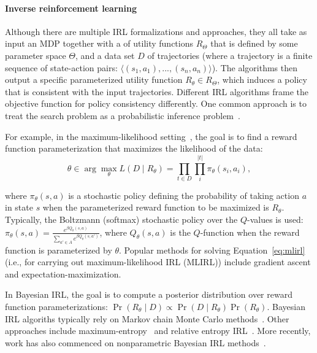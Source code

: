 
\vspace{\up}
\paragraph{Inverse reinforcement learning}

Although there are multiple IRL formalizations and approaches, they
all take as input an MDP together with a  of utility
functions $R_\Theta$ that is defined by some parameter space $\Theta$,
and a data set $D$ of trajectories (where a trajectory is a finite
sequence of state-action pairs: $\langle (s_1, a_1), ..., (s_n, a_n)
\rangle$). The algorithms then output a specific parameterized utility
function $R_\theta \in R_\Theta$, which induces a policy that is
consistent with the input trajectories.
%
Different IRL algorithms frame the objective function for policy
consistency differently. One common approach is to treat the
search problem as a probabilistic inference
problem~\cite{babes11,lopes2009active,ramachandran2007bayesian,ziebart2008maximum}. 

For example, in the maximum-likelihood setting~\cite{babes11}, the
goal is to find a reward function parameterization that maximizes
the likelihood of the data:
%
\begin{equation}
\label{eq:mlirl}
\theta \in \arg\max_{\theta} L(D \mid R_{\theta}) = \prod_{t \in D} \prod_i^{|t|} \pi_{\theta}(s_i, a_i),
\end{equation}

\noindent
where $\pi_{\theta}(s, a)$ is a stochastic policy defining the
probability of taking action $a$ in state $s$ when the parameterized
reward function to be maximized is $R_{\theta}$. Typically, the
Boltzmann (softmax) stochastic policy over the $Q$-values is used:
$\pi_{\theta}(s, a) = \frac{e^{\beta Q_{\theta}(s,a)}}{\sum_{a' \in A}
  e^{\beta Q_{\theta}(s,a')}}$, where $Q_\theta(s, a)$ is the $Q$-function
when the reward function is parameterized by $\theta$.
%
Popular methods for solving Equation~\ref{eq:mlirl} (i.e., for
carrying out maximum-likelihood IRL (MLIRL)) include gradient ascent
and expectation-maximization.

In Bayesian IRL, the goal is to compute a posterior distribution over
reward function parameterizations:
%
$\Pr(R_{\theta} \mid D) \propto \Pr(D \mid R_{\theta}) \Pr(R_\theta)$.
%
Bayesian IRL algoriths typically rely on Markov chain Monte Carlo
methods~\cite{journals/corr/abs-1208-2112,ramachandran2007bayesian}.
%
Other approaches include maximum-entropy~\cite{ziebart2008maximum}
and relative entropy IRL~\cite{BoulariasKP2011}. 
%
More recently, work has also commenced on
nonparametric Bayesian IRL methods~\cite{Choi:2012:NBI:2999134.2999169,Michini2012}.

